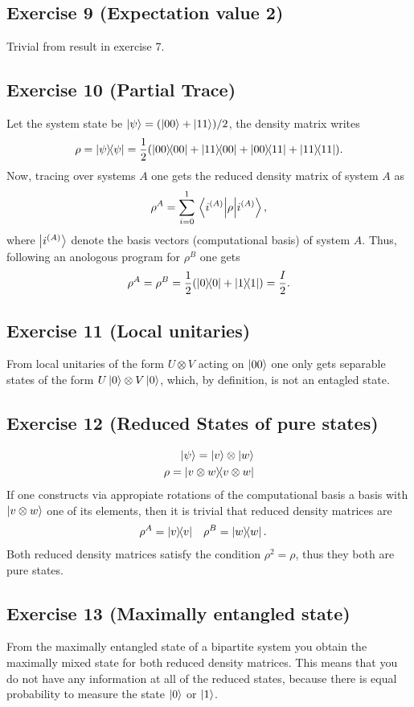 \subsection{Exercise 9 (Expectation value 2)}
Trivial from result in exercise 7.

\subsection{Exercise 10 (Partial Trace)}
Let the system state be $\ket{\psi}=\qty(\ket{00}+\ket{11})/2$, the 
density matrix writes
\begin{align}
\rho=\dyad{\psi}{\psi}=\frac{1}{2}\qty(\dyad{00}{00}+\dyad{11}{00}+
\dyad{00}{11}+\dyad{11}{11}).
\end{align}
Now, tracing over systems $A$ one gets the reduced density matrix of system $A$
as 
\begin{align}
\rho^A=\sum_{i=0}^1\matrixel{i^{(A)}}{\rho}{i^{(A)}},
\end{align}
where $\ket{i^{(A)}}$ denote the basis vectors (computational basis) of system $A$.
Thus, following an anologous program for $\rho^B$ one gets
\begin{align}
\rho^A=\rho^B=\frac{1}{2}\qty(\dyad{0}{0}+\dyad{1}{1})=\frac{I}{2}.
\end{align}

\subsection{Exercise 11 (Local unitaries)}
From local unitaries of the form $U\otimes V$ acting on $\ket{00}$ one only 
gets separable states of the form $U\ket{0}\otimes V\ket{0}$, which, by definition,
is not an entagled state. 

\subsection{Exercise 12 (Reduced States of pure states)}
\begin{align}
\ket{\psi}=\ket{v}\otimes\ket{w}\\
\rho=\dyad{v\otimes w}{v\otimes w}
\end{align}
If one constructs via appropiate rotations of the computational basis 
a basis with $\ket{v\otimes w}$ one of its elements, then it is trivial that 
reduced density matrices are
\begin{align}
\rho^A&=\dyad{v}{v} & \rho^B&=\dyad{w}{w}.
\end{align}
Both reduced density matrices satisfy the condition $\rho^2=\rho$, thus 
they both are pure states.

\subsection{Exercise 13 (Maximally entangled state)}\noindent
From the maximally entangled state of a bipartite system you obtain 
the maximally mixed state for both reduced density matrices. This means that
you do not have any information at all of the reduced states, because there is 
equal probability to measure the state $\ket{0}$ or $\ket{1}$.